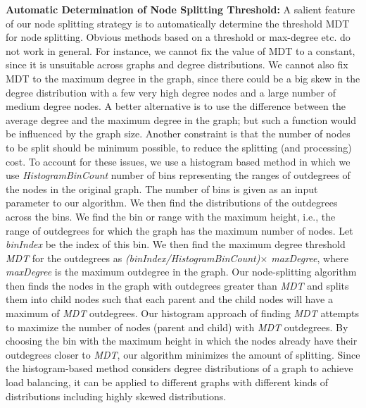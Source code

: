  
\vspace{0.1in}
\noindent
{\bf Automatic Determination of Node Splitting Threshold:}
A salient feature of our node splitting strategy is to automatically determine the threshold MDT for node splitting.
Obvious methods based on a threshold or max-degree etc. do not work in general.
For instance, we cannot fix the value of MDT to a constant, since it is unsuitable across graphs and degree distributions.
We cannot also fix MDT to the maximum degree in the graph, since there could be a big skew in the degree distribution with a few very high degree nodes and a large number of medium degree nodes.
A better alternative is to use the difference between the average degree and the maximum degree in the graph; but such a function would be influenced by the graph size.
Another constraint is that the number of nodes to be split should be minimum possible, to reduce the splitting (and processing) cost.
To account for these issues, 
we use a histogram based method in which we use \textit{HistogramBinCount} number of bins representing the ranges of outdegrees of the nodes in the original graph. 
The number of bins is given as an input parameter to our algorithm. 
We then find the distributions of the outdegrees across the bins. 
We find the bin or range with the maximum height, i.e., the range of outdegrees for which the graph has the maximum number of nodes. 
Let \textit{binIndex} be the index of this bin. 
We then find the maximum degree threshold \textit{MDT} for the outdegrees as \textit{(binIndex/HistogramBinCount)$\times$ maxDegree}, where \textit{maxDegree} is the maximum outdegree in the graph. 
Our node-splitting algorithm then finds the nodes in the graph with outdegrees greater than \textit{MDT} and splits them into child nodes such that each parent and the child nodes will have a maximum of \textit{MDT} outdegrees. 
Our histogram approach of finding \textit{MDT} attempts to maximize the number of nodes (parent and child) with \textit{MDT} outdegrees. 
By choosing the bin with the maximum height in which the nodes already have their outdegrees closer to \textit{MDT}, our algorithm minimizes the amount of splitting. 
Since the histogram-based method considers degree distributions of a graph to achieve load balancing, it can be applied to different graphs with different kinds of distributions including highly skewed distributions.

